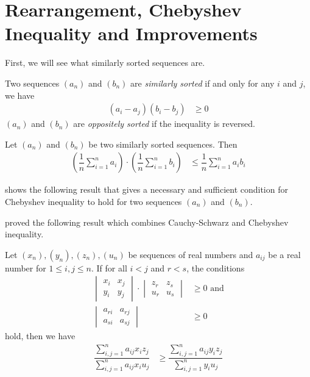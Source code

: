 \documentclass{subfile}
\begin{document}
	\section[Rearrangement and Chebyshev]{Rearrangement, Chebyshev Inequality and Improvements}\label{sec:rearragement}
	First, we will see what similarly sorted sequences are.
		\begin{definition}
			Two sequences $(a_n)$ and $(b_n)$ are \textit{similarly sorted} if and only for any $i$ and $j$, we have
				\begin{align*}
					(a_i-a_j)(b_i-b_j)
						& \geq0
				\end{align*}
			$(a_n)$ and $(b_n)$ are \textit{oppositely sorted} if the inequality is reversed.
		\end{definition}
	
		\begin{theorem}
			Let $(a_n)$ and $(b_n)$ be two similarly sorted sequences. Then
				\begin{align*}
					\left(\dfrac{1}{n}\sum_{i=1}^na_i\right)\cdot\left(\dfrac{1}{n}\sum_{i=1}^nb_i\right)
						& \leq\dfrac{1}{n}\sum_{i=1}^na_ib_i
				\end{align*}
		\end{theorem}
	\textcite{SASSER1967} shows the following result that gives a necessary and sufficient condition for Chebyshev inequality to hold for two sequences $(a_n)$ and $(b_n)$.
		\begin{theorem}
			
		\end{theorem}
	\textcite{Seitz1936} proved the following result which combines Cauchy-Schwarz and Chebyshev inequality.
		\begin{theorem}
			Let $(x_n),(y_n),(z_n),(u_n)$ be sequences of real numbers and $a_{ij}$ be a real number for $1\leq i,j\leq n$. If for all $i<j$ and $r<s$, the conditions
				\begin{align*}
					\begin{vmatrix}
						x_i & x_j\\
						y_i & y_j
					\end{vmatrix}\cdot
					\begin{vmatrix}
						z_r & z_s\\
						u_r & u_s
					\end{vmatrix}
						& \geq0\mbox{ and}\\
					\begin{vmatrix}
						a_{ri} & a_{rj}\\
						a_{si} & a_{sj}
					\end{vmatrix}
						& \geq0
				\end{align*}
			hold, then we have
				\begin{align*}
					\dfrac{\sum_{i,j=1}^na_{ij}x_iz_j}{\sum_{i,j=1}^na_{ij}x_iu_j}
						& \geq\dfrac{\sum_{i,j=1}^na_{ij}y_iz_j}{\sum_{i,j=1}^ny_iu_j}
				\end{align*}
		\end{theorem}
\end{document}
